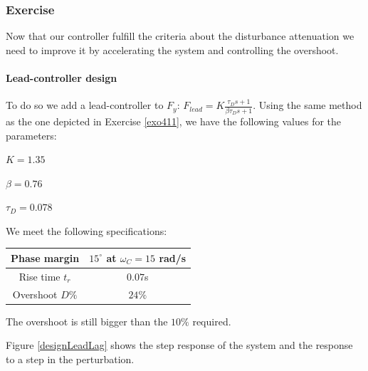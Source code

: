 \subsubsection{Exercise}

Now that our controller fulfill the criteria about the disturbance attenuation we need to improve it by accelerating the system and controlling the overshoot. 

\paragraph{Lead-controller design}

To do so we add a lead-controller to $F_y$: $F_{lead} = K \frac{\tau_D s + 1}{\beta \tau_D s +1}$.
Using the same method as the one depicted in Exercise \ref{exo411}, we have the following values for the parameters:
\begin{shortitemize}
    \item $K = 1.35$
    \item $\beta = 0.76$
    \item $\tau_D = 0.078$
\end{shortitemize}

We meet the following specifications:

\begin{center}
\begin{tabular}{|c|c|}
    \hline
    Phase margin & $15^{\circ}$ at $\omega_C = 15$ rad/s \\ 
    \hline
    Rise time $t_r$ & $0.07$s\\
    \hline
    Overshoot $D\%$ & $24\%$ \\ 
    \hline
\end{tabular}
\end{center}

The overshoot is still bigger than the $10\%$ required. 

Figure \ref{designLeadLag} shows the step response of the system and the response to a step in the perturbation. 

